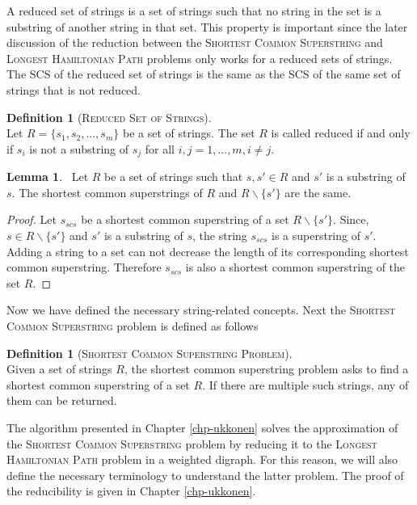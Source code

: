 \documentclass[english,twoside,censored,csm,algorithms-track-2020]{HYthesisML}
\theoremstyle{plain}
\theoremstyle{definition}
\newtheorem{lemma}[theorem]{Lemma}
\newtheorem{definition}[theorem]{Definition}
\begin{document}
A reduced set of strings is a set of strings such that no string in the set is a substring
of another string in that set. This property is important since the later discussion of the
reduction between the \textsc{Shortest Common Superstring} and \textsc{Longest Hamiltonian Path}
problems only works for a reduced sets of strings. The SCS of the reduced set of strings
is the same as the SCS of the same set of strings that is not reduced. 

\begin{definition}[\textsc{Reduced Set of Strings}]~\label{def-reduced}\\
  Let $R=\{s_1, s_2,...,s_m\}$ be a set of strings. The set $R$ is called reduced
  if and only if $s_i$ is not a substring of $s_j$ for all $i,j = 1,...,m, i\neq j$.
\end{definition}

\begin{lemma}~\label{lem-reduced}
  Let $R$ be a set of strings such that $s,s'\in R$ and $s'$ is a substring of $s$.
  The shortest common superstrings of $R$ and $R\backslash\{s'\}$ are the same.
\end{lemma}

\begin{proof}
  Let $s_{scs}$ be a shortest common superstring of a set $R\backslash\{s'\}$.
  Since, $s\in R\backslash\{s'\}$ and $s'$ is a substring of $s$, the string
  $s_{scs}$ is a superstring of $s'$. Adding a string to a set can not
  decrease the length of its corresponding shortest common superstring.
  Therefore $s_{scs}$ is also a shortest common superstring of the set
  $R$.
\end{proof}

Now we have defined the necessary string-related concepts. Next the
\textsc{Shortest Common Superstring} problem is defined as follows

\begin{definition}[\textsc{Shortest Common Superstring Problem}]~\label{def-scs-problem}\\
  Given a set of strings $R$, the shortest common superstring problem
  asks to find a shortest common superstring of a set $R$. If there
  are multiple such strings, any of them can be returned.
\end{definition}

The algorithm presented in Chapter \ref{chp-ukkonen} solves the approximation of the
\textsc{Shortest Common Superstring} problem by reducing it to the \textsc{Longest Hamiltonian Path}
problem in a weighted digraph. For this reason, we will also define the necessary terminology
to understand the latter problem. The proof of the reducibility is given in Chapter \ref{chp-ukkonen}.
\end{document}
